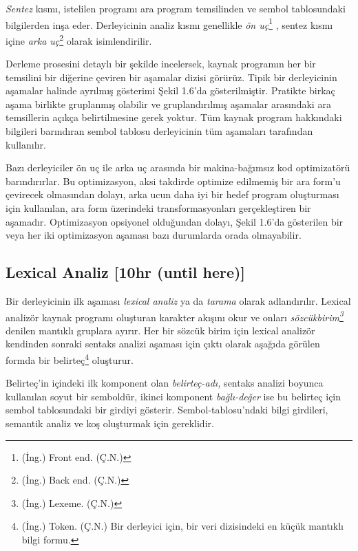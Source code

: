 \documentclass{book}
\begin{document}
\setcounter{footnote}{0}
\textit{Sentez} kısmı, istelilen programı ara program temsilinden ve sembol tablosundaki bilgilerden inşa eder. Derleyicinin analiz kısmı genellikle \textit{ön uç}\footnote{(İng.) Front end. (Ç.N.)} , sentez kısmı içine \textit{arka uç}\footnote{(İng.) Back end. (Ç.N.)}  olarak isimlendirilir.

Derleme prosesini detaylı bir şekilde incelersek, kaynak programın her bir temsilini bir diğerine çeviren bir aşamalar dizisi görürüz. Tipik bir derleyicinin aşamalar halinde ayrılmış gösterimi Şekil 1.6'da gösterilmiştir. Pratikte birkaç aşama birlikte gruplanmış olabilir ve gruplandırılmış aşamalar arasındaki ara temsillerin açıkça belirtilmesine gerek yoktur. Tüm kaynak program hakkındaki bilgileri barındıran sembol tablosu derleyicinin tüm aşamaları tarafından kullanılır.



Bazı derleyiciler ön uç ile arka uç arasında bir makina-bağımsız kod optimizatörü barındırırlar. Bu optimizasyon, aksi takdirde optimize edilmemiş bir ara form'u çevirecek olmasından dolayı, arka ucun daha iyi bir hedef program oluşturması için kullanılan, ara form üzerindeki transformasyonları gerçekleştiren bir aşamadır. Optimizasyon opsiyonel olduğundan dolayı, Şekil 1.6'da gösterilen bir veya her iki optimizasyon aşaması bazı durumlarda orada olmayabilir.

\subsection{Lexical Analiz [10hr (until here)]}

\setcounter{footnote}{0}

Bir derleyicinin ilk aşaması \textit{lexical analiz} ya da \textit{tarama} olarak adlandırılır. Lexical analizör kaynak programı oluşturan karakter akışını okur ve onları \textit{sözcükbirim\footnote{(İng.) Lexeme. (Ç.N.)}} denilen mantıklı gruplara ayırır. Her bir sözcük birim için lexical analizör kendinden sonraki sentaks analizi aşaması için çıktı olarak aşağıda görülen formda bir belirteç\footnote{(İng.) Token. (Ç.N.) Bir derleyici için, bir veri dizisindeki en küçük mantıklı bilgi formu.} oluşturur.

{}


Belirteç'in içindeki ilk komponent olan \textit{belirteç-adı,} sentaks analizi boyunca kullanılan soyut bir semboldür, ikinci komponent \textit{bağlı-değer} ise bu belirteç için sembol tablosundaki bir girdiyi gösterir. Sembol-tablosu'ndaki bilgi girdileri, semantik analiz ve koş oluşturmak için gereklidir.
\end{document}
